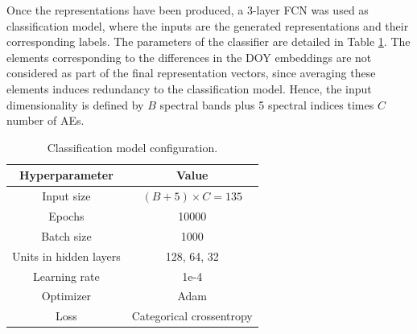 \documentclass[journal,article,submit,pdftex,moreauthors]{Definitions/mdpi}
\begin{document}
Once the representations have been produced, a 3-layer FCN was used as classification model, where the inputs are the generated representations and their corresponding labels. The parameters of the classifier are detailed in Table \ref{fcn_hyperparameters}.
The elements corresponding to the differences in the \ac{DOY} embeddings are not considered as part of the final representation vectors, since averaging these elements induces redundancy to the classification model. Hence, the input dimensionality is defined by $B$ spectral bands plus 5 spectral indices times $C$ number of AEs.
\begin{table}[H]
	\centering
	\caption{Classification model configuration.}
	\begin{tabular}{c|c}
	\hline
		Hyperparameter & Value \\ \hline
		Input size & $(B + 5) \times C = 135$ \\
		Epochs & 10000 \\ 
		Batch size & 1000\\ 
		Units in hidden layers & 128, 64, 32 \\  
		Learning rate & 1e-4 \\
		Optimizer & Adam \\ 
		Loss & Categorical crossentropy \\ \hline
	\end{tabular}
	\label{fcn_hyperparameters}
\end{table}

\end{document}
